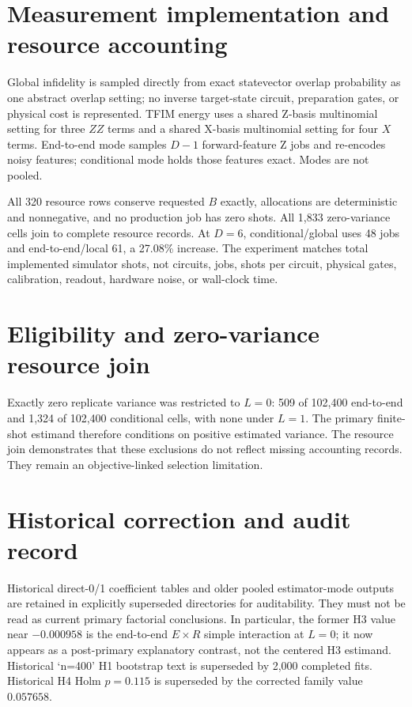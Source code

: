 \documentclass[pdflatex,sn-basic,Numbered]{sn-jnl}
\begin{document}
\section{Measurement implementation and resource accounting}

Global infidelity is sampled directly from exact statevector overlap probability as one abstract overlap setting; no inverse target-state circuit, preparation gates, or physical cost is represented. TFIM energy uses a shared Z-basis multinomial setting for three $ZZ$ terms and a shared X-basis multinomial setting for four $X$ terms. End-to-end mode samples $D-1$ forward-feature Z jobs and re-encodes noisy features; conditional mode holds those features exact. Modes are not pooled.

All 320 resource rows conserve requested $B$ exactly, allocations are deterministic and nonnegative, and no production job has zero shots. All 1,833 zero-variance cells join to complete resource records. At $D=6$, conditional/global uses 48 jobs and end-to-end/local 61, a 27.08\% increase. The experiment matches total implemented simulator shots, not circuits, jobs, shots per circuit, physical gates, calibration, readout, hardware noise, or wall-clock time.

\section{Eligibility and zero-variance resource join}

Exactly zero replicate variance was restricted to $L=0$: 509 of 102,400 end-to-end and 1,324 of 102,400 conditional cells, with none under $L=1$. The primary finite-shot estimand therefore conditions on positive estimated variance. The resource join demonstrates that these exclusions do not reflect missing accounting records. They remain an objective-linked selection limitation.

\section{Historical correction and audit record}

Historical direct-0/1 coefficient tables and older pooled estimator-mode outputs are retained in explicitly superseded directories for auditability. They must not be read as current primary factorial conclusions. In particular, the former H3 value near $-0.000958$ is the end-to-end $E\times R$ simple interaction at $L=0$; it now appears as a post-primary explanatory contrast, not the centered H3 estimand. Historical `n=400' H1 bootstrap text is superseded by 2,000 completed fits. Historical H4 Holm $p=0.115$ is superseded by the corrected family value $0.057658$.
\end{document}
